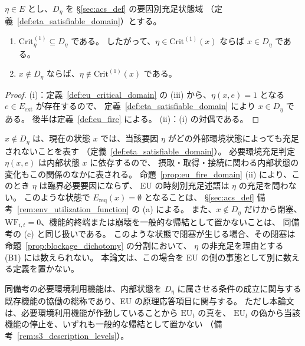 \begin{proposition}[臨界必要要因と要因別充足状態域]
\label{prop:eu_fire_domain}
$\eta\in E$ とし、$D_\eta$ を \S\ref{sec:acs_def} の要因別充足状態域
（定義~\ref{def:eta_satisfiable_domain}）とする。
\begin{enumerate}[label=(\roman*)]
  \item $\mathrm{Crit}^{(1)}_\eta\subseteq D_\eta$ である。
  したがって、$\eta\in\mathrm{Crit}^{(1)}(x)$ ならば $x\in D_\eta$ である。
  \item $x\notin D_\eta$ ならば、$\eta\notin\mathrm{Crit}^{(1)}(x)$ である。
\end{enumerate}
\end{proposition}

\begin{proof}
(i)：定義~\ref{def:eu_critical_domain} の (iii) から、$\eta(x,e)=1$ となる $e\in E_{\mathrm{ext}}$ が存在するので、
定義~\ref{def:eta_satisfiable_domain} により $x\in D_\eta$ である。
後半は定義~\ref{def:eu_fire} による。
(ii)：(i) の対偶である。
\end{proof}

\begin{remark}[現在状態で充足不能な要因と EU]
\label{rem:eu_env_utilization}
$x\notin D_\eta$ は、現在の状態 $x$ では、当該要因 $\eta$ がどの外部環境状態によっても充足されないことを表す
（定義~\ref{def:eta_satisfiable_domain}）。
必要環境充足判定 $\eta(x,e)$ は内部状態 $x$ に依存するので、
摂取・取得・接続に関わる内部状態の変化もこの関係のなかに表される。
命題~\ref{prop:eu_fire_domain} (ii) により、このとき $\eta$ は臨界必要要因にならず、
EU の時刻別充足述語は $\eta$ の充足を問わない。
このような状態で $E_{\mathrm{req}}(x)=\emptyset$ となることは、
\S\ref{sec:acs_def} 備考~\ref{rem:env_utilization_function} の (a) による。
また、$x\notin D_\eta$ だけから閉塞、$\mathrm{WF}_{i,t}=0$、機能的終端または崩壊を一般的な帰結として置かないことは、
同備考の (c) と同じ扱いである。
このような状態で閉塞が生じる場合、その閉塞は命題~\ref{prop:blockage_dichotomy} の分割において、
$\eta$ の非充足を理由とする (B1) には数えられない。
本論文は、この場合を EU の側の事態として別に数える定義を置かない。

同備考の必要環境利用機能は、内部状態を $D_\eta$ に属させる条件の成立に関与する
既存機能の協働の総称であり、EU の原理応答項目に関与する。
ただし本論文は、必要環境利用機能が作動していることから $\mathrm{EU}_t$ の真を、
$\mathrm{EU}_t$ の偽から当該機能の停止を、いずれも一般的な帰結として置かない
（備考~\ref{rem:s3_description_levels}）。
\end{remark}

